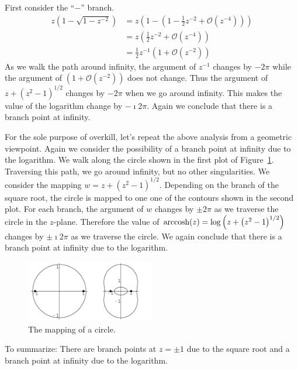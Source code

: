 {\begin{Solution}
\begin{enumerate}
  First consider the ``$-$'' branch.
  \begin{align*}
    z \left( 1 - \sqrt{1 - z^{-2}} \right)
    &= z \left( 1 - \left(1 - \frac{1}{2} z^{-2} 
        + \mathcal{O}\left(z^{-4} \right) \right) \right)
    \\
    &= z \left( \frac{1}{2} z^{-2} + \mathcal{O}\left(z^{-4} \right) \right)
    \\
    &= \frac{1}{2} z^{-1} \left( 1 + \mathcal{O}\left(z^{-2} \right) \right)
  \end{align*}
  As we walk the path around infinity, the argument of $z^{-1}$ changes by $-2 \pi$
  while the argument of $\left( 1 + \mathcal{O}\left(z^{-2} \right) \right)$ 
  does not change.
  Thus the argument of $z + \left( z^2 - 1 \right)^{1/2}$ changes by $-2 \pi$ when 
  we go around infinity.  This makes the value of the logarithm change by 
  $-\imath 2 \pi$.  Again we conclude that there is a branch point at infinity.

  For the sole purpose of overkill, let's repeat the above analysis from a 
  geometric viewpoint.  Again we consider the possibility of a branch point
  at infinity due to the logarithm.  We walk along the circle shown in 
  the first plot of Figure~\ref{figure map-z11z2}.  Traversing this path, 
  we go around infinity, but no other singularities.  We consider the 
  mapping $w = z + \left( z^2 - 1 \right)^{1/2}$.  Depending on the branch of the 
  square root, the circle is mapped to one one of the contours shown in the 
  second plot.  For each branch, the argument of $w$ changes by $\pm 2 \pi$ as 
  we traverse the circle in the $z$-plane.  Therefore the value of 
  $\mathop{\mathrm{arccosh}}\nolimits(z) = \log \left( z + \left( z^2 - 1 \right)^{1/2} \right)$ changes 
  by $\pm \imath 2 \pi$ as we traverse the circle.  We again conclude that there 
  is a branch point at infinity due to the logarithm.
  \begin{figure}[htbp!]
    \begin{center}
      \includegraphics[width=0.5\textwidth]{fcv/function/map-z11z2}
    \end{center}
    \caption{The mapping of a circle.}
    \label{figure map-z11z2}
  \end{figure}

  To summarize:  There are branch points at $z = \pm 1$ due to the square root
  and a branch point at infinity due to the logarithm.
  \end{enumerate}
\end{Solution}
}








